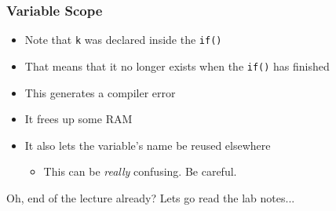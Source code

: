 \documentclass[14pt]{beamer}
\begin{document}
\begin{frame}
\frametitle{Variable Scope}
\begin{itemize}
\item Note that \texttt{k} was declared inside the \texttt{if()}
\item That means that it no longer exists when the \texttt{if()} has finished
\item This generates a compiler error
\item It frees up some RAM
\item It also lets the variable's name be reused elsewhere
	\begin{itemize}
		\item This can be \textit{really} confusing. Be careful.
	\end{itemize}
\end{itemize}
\end{frame}

\begin{frame}
\begin{center}
Oh, end of the lecture already?
Lets go read the lab notes...
\end{center}
\end{frame}
\end{document}
